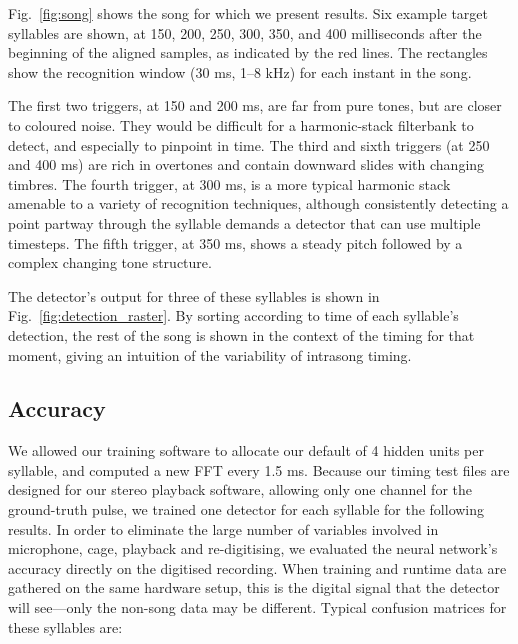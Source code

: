 \documentclass[10pt,letterpaper]{article}
\newcommand\fig[1]{Fig.~\ref{#1}}
\let\oldmarginpar\marginpar
\renewcommand{\marginpar}[1]{\oldmarginpar{\linespread{1}\scriptsize{#1}}}
\begin{document}
\fig{fig:song} shows the song for which we present results.  Six example target syllables are shown, at 150, 200, 250, 300, 350, and 400 milliseconds after the beginning of the aligned samples, as indicated by the red lines.  The rectangles show the recognition window (30 ms, 1--8 kHz) for each instant in the song.

The first two triggers, at 150 and 200 ms, are far from pure tones, but are closer to coloured noise.  They would be difficult for a harmonic-stack filterbank to detect, and especially to pinpoint in time.  The third and sixth triggers (at 250 and 400 ms) are rich in overtones and contain downward slides with changing timbres.  The fourth trigger, at 300 ms, is a more typical harmonic stack amenable to a variety of recognition techniques, although consistently detecting a point partway through the syllable demands a detector that can use multiple timesteps.  The fifth trigger, at 350 ms, shows a steady pitch followed by a complex changing tone structure.

The detector's output for three of these syllables is shown in \fig{fig:detection_raster}.   By sorting according to time of each syllable's detection, the rest of the song is shown in the context of the timing for that moment, giving an intuition of the variability of intrasong timing.

\subsection{Accuracy}

We allowed our training software to allocate our default of 4 hidden units per syllable, and computed a new FFT every 1.5 ms.  Because our timing test files are designed for our stereo playback software, allowing only one channel for the ground-truth pulse, we trained one detector for each syllable for the following results.  In order to eliminate the large number of variables involved in microphone, cage, playback and re-digitising, we evaluated the neural network's accuracy directly on the digitised recording.  When training and runtime data are gathered on the same hardware setup, this is the digital signal that the detector will see---only the non-song data may be different.
Typical confusion matrices for these syllables are:
\end{document}
